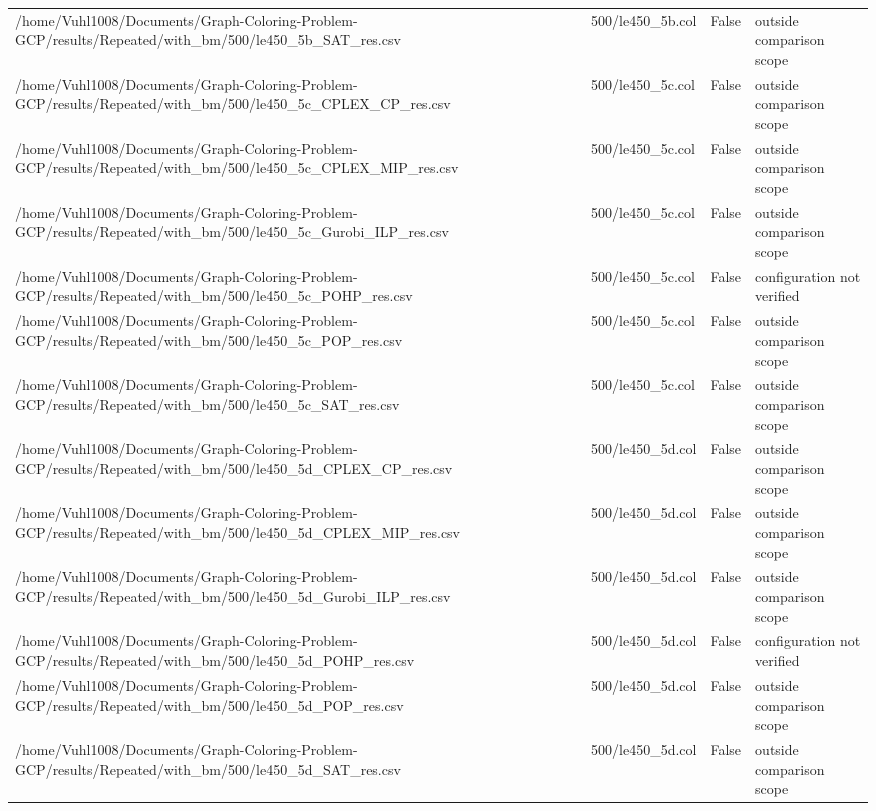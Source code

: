 \begin{table}[htbp]
\begin{tabular}{llll}
/home/Vuhl1008/Documents/Graph-Coloring-Problem-GCP/results/Repeated/with\_bm/500/le450\_5b\_SAT\_res.csv & 500/le450\_5b.col & False & outside comparison scope \\
/home/Vuhl1008/Documents/Graph-Coloring-Problem-GCP/results/Repeated/with\_bm/500/le450\_5c\_CPLEX\_CP\_res.csv & 500/le450\_5c.col & False & outside comparison scope \\
/home/Vuhl1008/Documents/Graph-Coloring-Problem-GCP/results/Repeated/with\_bm/500/le450\_5c\_CPLEX\_MIP\_res.csv & 500/le450\_5c.col & False & outside comparison scope \\
/home/Vuhl1008/Documents/Graph-Coloring-Problem-GCP/results/Repeated/with\_bm/500/le450\_5c\_Gurobi\_ILP\_res.csv & 500/le450\_5c.col & False & outside comparison scope \\
/home/Vuhl1008/Documents/Graph-Coloring-Problem-GCP/results/Repeated/with\_bm/500/le450\_5c\_POHP\_res.csv & 500/le450\_5c.col & False & configuration not verified \\
/home/Vuhl1008/Documents/Graph-Coloring-Problem-GCP/results/Repeated/with\_bm/500/le450\_5c\_POP\_res.csv & 500/le450\_5c.col & False & outside comparison scope \\
/home/Vuhl1008/Documents/Graph-Coloring-Problem-GCP/results/Repeated/with\_bm/500/le450\_5c\_SAT\_res.csv & 500/le450\_5c.col & False & outside comparison scope \\
/home/Vuhl1008/Documents/Graph-Coloring-Problem-GCP/results/Repeated/with\_bm/500/le450\_5d\_CPLEX\_CP\_res.csv & 500/le450\_5d.col & False & outside comparison scope \\
/home/Vuhl1008/Documents/Graph-Coloring-Problem-GCP/results/Repeated/with\_bm/500/le450\_5d\_CPLEX\_MIP\_res.csv & 500/le450\_5d.col & False & outside comparison scope \\
/home/Vuhl1008/Documents/Graph-Coloring-Problem-GCP/results/Repeated/with\_bm/500/le450\_5d\_Gurobi\_ILP\_res.csv & 500/le450\_5d.col & False & outside comparison scope \\
/home/Vuhl1008/Documents/Graph-Coloring-Problem-GCP/results/Repeated/with\_bm/500/le450\_5d\_POHP\_res.csv & 500/le450\_5d.col & False & configuration not verified \\
/home/Vuhl1008/Documents/Graph-Coloring-Problem-GCP/results/Repeated/with\_bm/500/le450\_5d\_POP\_res.csv & 500/le450\_5d.col & False & outside comparison scope \\
/home/Vuhl1008/Documents/Graph-Coloring-Problem-GCP/results/Repeated/with\_bm/500/le450\_5d\_SAT\_res.csv & 500/le450\_5d.col & False & outside comparison scope \\

\end{tabular}
\end{table}
